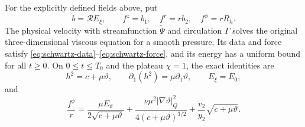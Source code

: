 \begin{proposition}
\label{prop:sc-transfer}
For the explicitly defined fields above, put
\begin{equation}\label{eq:sc-forces}
 b=\mathcal R E_\xi,\qquad
 f^z=b_1,\quad f^r=rb_2,\quad f^\phi=rR_h.
\end{equation}
The physical velocity with streamfunction $\widetilde\Psi$ and
circulation $\Gamma$ solves the original three-dimensional viscous
equation for a smooth pressure. Its data and force satisfy
\eqref{eq:schwartz-data}--\eqref{eq:schwartz-force}, and its energy
has a uniform bound for all $t\geq0$.
On $0\leq t\leq T_0$ and the plateau $\chi=1$, the exact identities are
\[
 h^2=c+\mu\vartheta,\qquad
 \partial_1(h^2)=\mu\partial_1\vartheta,\qquad
 E_\xi=E_0,
\]
and
\begin{equation}\label{eq:sc-core-force}
 \frac{f^\phi}{r}
 =\frac{\mu E_\vartheta}{2\sqrt{c+\mu\vartheta}}
  +\frac{\nu\mu^2|\nabla\vartheta|_Q^2}
                    {4(c+\mu\vartheta)^{3/2}}
  +\frac{v_2}{y_2}\sqrt{c+\mu\vartheta}.
\end{equation}
\end{proposition}

